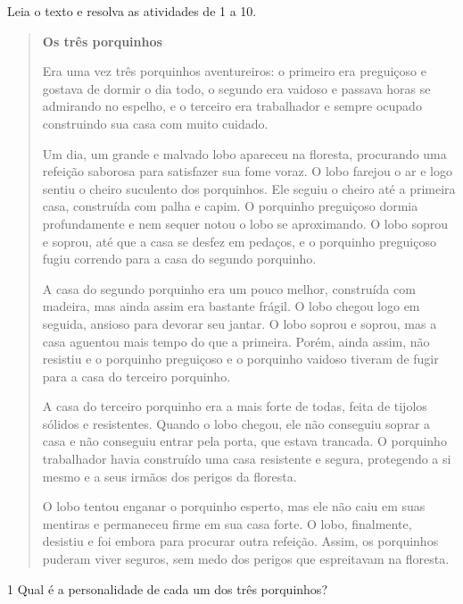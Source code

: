 
Leia o texto e resolva as atividades de 1 a 10.

\begin{quote}
\textbf{Os três porquinhos}

Era uma vez três porquinhos aventureiros: o primeiro era preguiçoso e
gostava de dormir o dia todo, o segundo era vaidoso e passava horas se
admirando no espelho, e o terceiro era trabalhador e sempre ocupado
construindo sua casa com muito cuidado.

Um dia, um grande e malvado lobo apareceu na floresta, procurando uma
refeição saborosa para satisfazer sua fome voraz. O lobo farejou o ar e
logo sentiu o cheiro suculento dos porquinhos. Ele seguiu o cheiro até a
primeira casa, construída com palha e capim. O porquinho preguiçoso
dormia profundamente e nem sequer notou o lobo se aproximando. O lobo
soprou e soprou, até que a casa se desfez em pedaços, e o porquinho
preguiçoso fugiu correndo para a casa do segundo porquinho.

A casa do segundo porquinho era um pouco melhor, construída com madeira,
mas ainda assim era bastante frágil. O lobo chegou logo em seguida,
ansioso para devorar seu jantar. O lobo soprou e soprou, mas a casa
aguentou mais tempo do que a primeira. Porém, ainda assim, não resistiu e
o porquinho preguiçoso e o porquinho vaidoso tiveram de fugir para a casa
do terceiro porquinho.

A casa do terceiro porquinho era a mais forte de todas, feita de tijolos
sólidos e resistentes. Quando o lobo chegou, ele não conseguiu soprar a
casa e não conseguiu entrar pela porta, que estava trancada. O porquinho
trabalhador havia construído uma casa resistente e segura, protegendo a
si mesmo e a seus irmãos dos perigos da floresta.

O lobo tentou enganar o porquinho esperto, mas ele não caiu em suas
mentiras e permaneceu firme em sua casa forte. O lobo, finalmente,
desistiu e foi embora para procurar outra refeição. Assim, os porquinhos
puderam viver seguros, sem medo dos perigos que espreitavam na floresta.

\end{quote}


\num{1} Qual é a personalidade de cada um dos três porquinhos?




